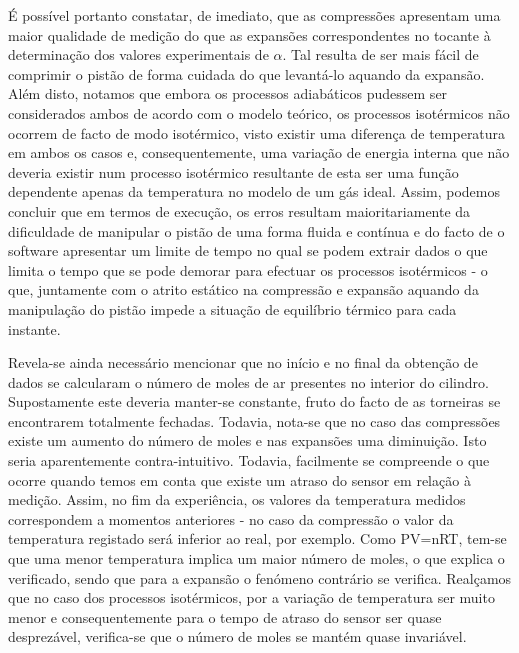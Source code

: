 \par É possível portanto constatar, de imediato, que as compressões apresentam uma maior qualidade de medição do que as expansões correspondentes no tocante à determinação dos valores experimentais de $\alpha$. Tal resulta de ser mais fácil de comprimir o pistão de forma cuidada do que levantá-lo aquando da expansão. Além disto, notamos que embora os processos adiabáticos pudessem ser considerados ambos de acordo com o modelo teórico, os processos isotérmicos não ocorrem de facto de modo isotérmico, visto existir uma diferença de temperatura em ambos os casos e, consequentemente, uma variação de energia interna que não deveria existir num processo isotérmico resultante de esta ser uma função dependente apenas da temperatura no modelo de um gás ideal. Assim, podemos concluir que em termos de execução, os erros resultam maioritariamente da dificuldade de manipular o pistão de uma forma fluida e contínua e do facto de o software apresentar um limite de tempo no qual se podem extrair dados o que limita o tempo que se pode demorar para efectuar os processos isotérmicos - o que, juntamente com o atrito estático na compressão e expansão aquando da manipulação do pistão impede a situação de equilíbrio térmico para cada instante.

\par Revela-se ainda necessário mencionar que no início e no final da obtenção de dados se calcularam o número de moles de ar presentes no interior do cilindro. Supostamente este deveria manter-se constante, fruto do facto de as torneiras se encontrarem totalmente fechadas. Todavia, nota-se que no caso das compressões existe um aumento do número de moles e nas expansões uma diminuição. Isto seria aparentemente contra-intuitivo. Todavia, facilmente se compreende o que ocorre quando temos em conta que existe um atraso do sensor em relação à medição. Assim, no fim da experiência, os valores da temperatura medidos correspondem a momentos anteriores - no caso da compressão o valor da temperatura registado será inferior ao real, por exemplo. Como PV=nRT, tem-se que uma menor temperatura implica um maior número de moles, o que explica o verificado, sendo que para a expansão o fenómeno contrário se verifica. Realçamos que no caso dos processos isotérmicos, por a variação de temperatura ser muito menor e consequentemente para o tempo de atraso do sensor ser quase desprezável, verifica-se que o número de moles se mantém quase invariável.

